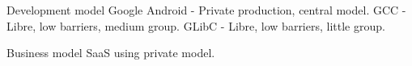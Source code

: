 Development model
Google Android - Private production, central model.
GCC - Libre, low barriers, medium group.
GLibC - Libre, low barriers, little group.

Business model
SaaS using private model.

\begin{comment}
\section{Strategic uses of Libre Software}

\emph{No cambias el modelo de negocio tradicional pero te apoyas en productos FLOSS para reforzalo.}

Es muy difícil encontrar una empresa que no utilice ningún producto de FLOSS. FLOSS es adaptativo
para los requisitos de una empresa. Traducciones, adaptaciones a distintos tipos de hardware,
interoperabilidad, entornos organizativos, culturales, nuevas tecnologías.

Otra tendencia, es la estrategia de liberar distintas distribuciones de software como FLOSS
para crear una comunidad libre alrededor.

Apple, Microsoft, Facebook, liberan partes de su código para crear una comunidad para mantener
el producto por parte de la misma.

Desequilibrios.

Usuarios que no quieren pagar por el Software privativo y se conforman con el programa libre y gratuito.
Pueden llegar a mejorar al modelo privativo. El privativo se ve desafiado cuando aparece una solución FLOSS
fiable que genere una aceptación en el mercado. (sitemas embebidos)

\section{Carlo Daffara taxonomy}


\end{comment}
